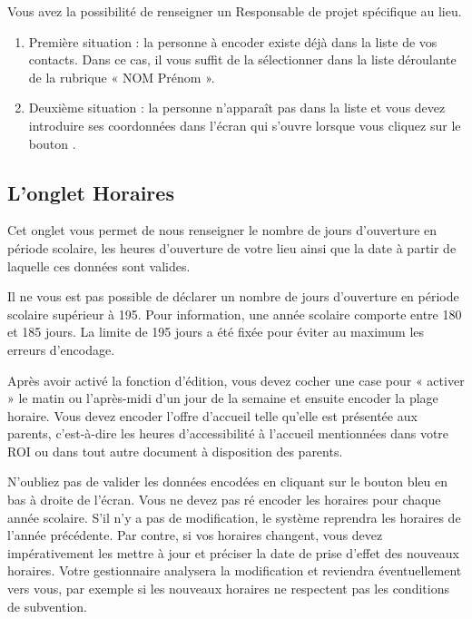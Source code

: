 Vous avez la possibilité de renseigner un Responsable de projet spécifique au lieu. 
\begin{enumerate}
    \item Première situation : la personne à encoder existe déjà dans la liste de vos contacts. Dans ce cas, il vous suffit de la sélectionner dans la liste déroulante de la rubrique « NOM Prénom ».
    \item Deuxième situation : la personne n’apparaît pas dans la liste et vous devez introduire ses coordonnées dans l’écran qui s’ouvre lorsque vous cliquez sur le bouton .  
\end{enumerate}

\subsection{L'onglet Horaires}
Cet onglet vous permet de nous renseigner le nombre de jours d’ouverture en période scolaire, les heures d’ouverture de votre lieu ainsi que la date à partir de laquelle ces données sont valides.

\begin{info}
Il ne vous est pas possible de déclarer un nombre de jours d’ouverture en période scolaire supérieur à 195. Pour information, une année scolaire comporte entre 180 et 185 jours. La limite de 195 jours a été fixée pour éviter au maximum les erreurs d’encodage.
\end{info}

Après avoir activé la fonction d’édition, vous devez cocher une case pour « activer » le matin ou l’après-midi d’un jour de la semaine et ensuite encoder la plage horaire.
Vous devez encoder l’offre d’accueil telle qu’elle est présentée aux parents, c’est-à-dire les heures d’accessibilité à l’accueil mentionnées dans votre ROI ou dans tout autre document à disposition des parents.

N’oubliez pas de valider les données encodées en cliquant sur le bouton bleu  en bas à droite de l’écran. Vous ne devez pas ré encoder les horaires pour chaque année scolaire. S’il n’y a pas de modification, le système reprendra les horaires de l’année précédente. Par contre, si vos horaires changent, vous devez impérativement les mettre à jour et préciser la date de prise d’effet des nouveaux horaires. Votre gestionnaire analysera la modification et reviendra éventuellement vers vous, par exemple si les nouveaux horaires ne respectent pas les conditions de subvention.  

